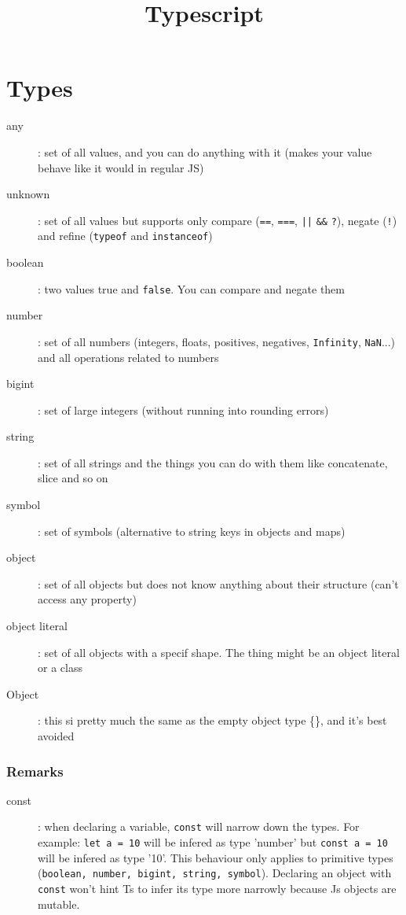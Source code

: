 \documentclass[french]{article}
\title{Typescript}
\begin{document}
\date{}

\maketitle

\section{Types}

\begin{description}
  \item[any]: set of all values, and you can do anything with it (makes your value behave like it would in regular JS)
  \item[unknown]: set of all values but supports only compare (\lstinline{==}, \lstinline{===}, \lstinline{||} \lstinline{&&} \lstinline{?}), negate (\lstinline{!}) and refine (\lstinline{typeof} and \lstinline{instanceof})
  \item[boolean]: two values true and \lstinline{false}. You can compare and negate them
  \item[number]: set of all numbers (integers, floats, positives, negatives, \lstinline{Infinity}, \lstinline{NaN}...) and all operations related to numbers
  \item[bigint]: set of large integers (without running into rounding errors)
  \item[string]: set of all strings and the things you can do with them like concatenate, slice and so on
  \item[symbol]: set of symbols (alternative to string keys in objects and maps)
  \item[object]: set of all objects but does not know anything about their structure (can't access any property)
  \item[object literal]: set of all objects with a specif shape. The thing might be an object literal or a class
  \item[Object]: this si pretty much the same as the empty object type \{\}, and it's best avoided
\end{description}


\subsubsection{Remarks}

\begin{description}
  \item[const]: when declaring a variable, \lstinline{const} will narrow down the types. For example: \lstinline{let a = 10} will be infered as type 'number' but \lstinline{const a = 10} will be infered as type '10'. This behaviour only applies to primitive types (\lstinline{boolean, number, bigint, string, symbol}). Declaring an object with \lstinline{const} won't hint Ts to infer its type more narrowly because Js objects are mutable.
\end{description}
\end{document}
